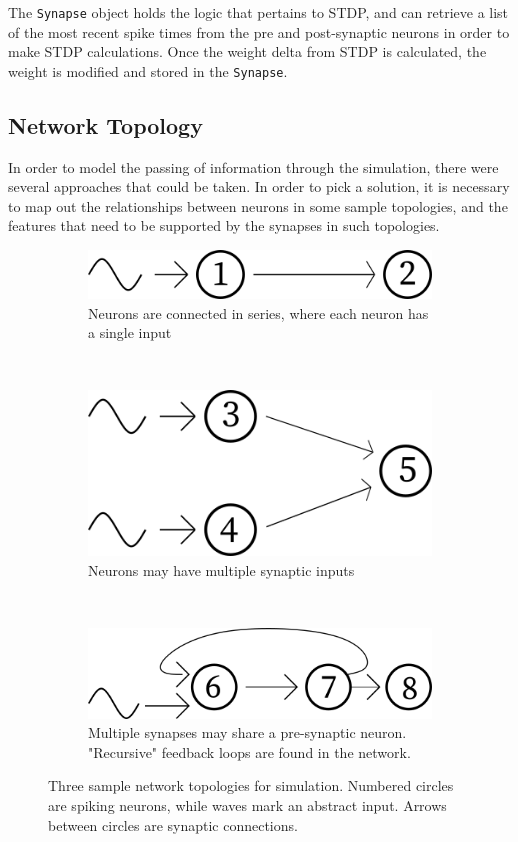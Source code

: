 The \texttt{Synapse} object holds the logic that pertains to STDP, and can
retrieve a list of the most recent spike times from the pre and post-synaptic
neurons in order to make STDP calculations. Once the weight delta from STDP is
calculated, the weight is modified and stored in the \texttt{Synapse}.

\FloatBarrier

\subsection{Network Topology}

In order to model the passing of information through the simulation, there were
several approaches that could be taken. In order to pick a solution, it is
necessary to map out the relationships between neurons in some sample topologies,
and the features that need to be supported by the synapses in such topologies. 

\begin{figure}[h!]
    \begin{subfigure}{1\textwidth}
        \centering
        \includegraphics[width=0.35\linewidth]{figures/tops/top1.png}
        \caption{Neurons are connected in series, where each neuron has a single input}
        \label{fig:top1}
    \end{subfigure} \vspace{1ex} \\ 
    \begin{subfigure}{1\textwidth}
        \centering
        \includegraphics[width=0.35\linewidth]{figures/tops/top2.png}
        \caption{Neurons may have multiple synaptic inputs}
        \label{fig:top2}
    \end{subfigure} \vspace{1ex} \\
    \begin{subfigure}{1\textwidth}
        \centering
        \includegraphics[width=0.35\linewidth]{figures/tops/top3.png}
        \caption{Multiple synapses may share a pre-synaptic neuron. "Recursive" feedback loops are found in the network.}
        \label{fig:top3}
    \end{subfigure}
    \vspace{1ex}
    \caption[Sample network topologies for simulation]{Three sample network topologies for simulation. Numbered circles are spiking neurons, while waves mark an abstract input. Arrows between circles are synaptic connections.}
    \label{fig:tops}
\end{figure}

